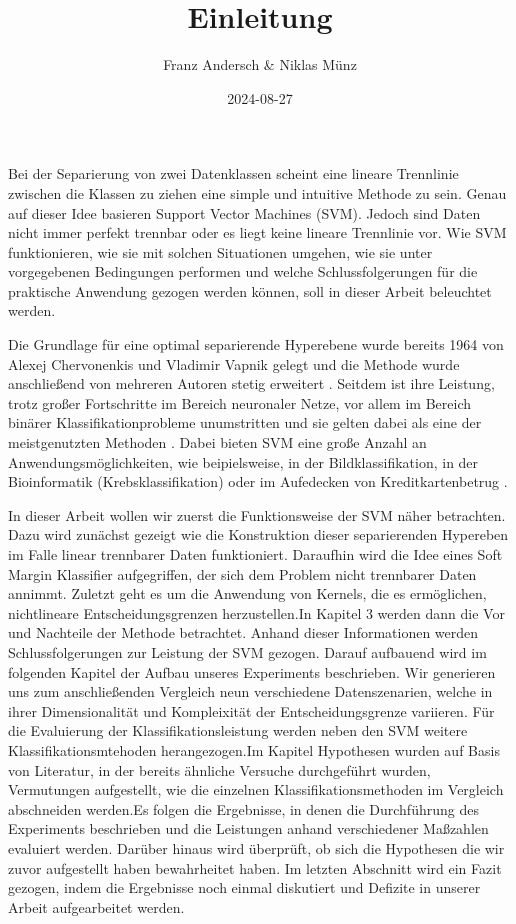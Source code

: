 \documentclass[
]{article}
\title{Einleitung}
\author{Franz Andersch \& Niklas Münz}
\date{2024-08-27}
\renewcommand{\maketitle}{}
\begin{document}
\maketitle

Bei der Separierung von zwei Datenklassen scheint eine lineare
Trennlinie zwischen die Klassen zu ziehen eine simple und intuitive
Methode zu sein. Genau auf dieser Idee basieren Support Vector Machines
(SVM). Jedoch sind Daten nicht immer perfekt trennbar oder es liegt
keine lineare Trennlinie vor. Wie SVM funktionieren, wie sie mit solchen
Situationen umgehen, wie sie unter vorgegebenen Bedingungen performen
und welche Schlussfolgerungen für die praktische Anwendung gezogen
werden können, soll in dieser Arbeit beleuchtet werden.

Die Grundlage für eine optimal separierende Hyperebene wurde bereits
1964 von Alexej Chervonenkis und Vladimir Vapnik gelegt und die Methode
wurde anschließend von mehreren Autoren stetig erweitert
\parencite{vapnikEstimationDependencesBased2006}. Seitdem ist ihre
Leistung, trotz großer Fortschritte im Bereich neuronaler Netze, vor
allem im Bereich binärer Klassifikationprobleme unumstritten und sie
gelten dabei als eine der meistgenutzten Methoden
\parencite{soofiClassificationTechniquesMachine2017}. Dabei bieten SVM
eine große Anzahl an Anwendungsmöglichkeiten, wie beipielsweise, in der
Bildklassifikation, in der Bioinformatik (Krebsklassifikation) oder im
Aufedecken von Kreditkartenbetrug
\parencite{cervantesComprehensiveSurveySupport2020}.

In dieser Arbeit wollen wir zuerst die Funktionsweise der SVM näher
betrachten. Dazu wird zunächst gezeigt wie die Konstruktion dieser
separierenden Hypereben im Falle linear trennbarer Daten funktioniert.
Daraufhin wird die Idee eines Soft Margin Klassifier aufgegriffen, der
sich dem Problem nicht trennbarer Daten annimmt. Zuletzt geht es um die
Anwendung von Kernels, die es ermöglichen, nichtlineare
Entscheidungsgrenzen herzustellen.\newline In Kapitel 3 werden dann die
Vor und Nachteile der Methode betrachtet. Anhand dieser Informationen
werden Schlussfolgerungen zur Leistung der SVM gezogen. Darauf aufbauend
wird im folgenden Kapitel der Aufbau unseres Experiments beschrieben.
Wir generieren uns zum anschließenden Vergleich neun verschiedene
Datenszenarien, welche in ihrer Dimensionalität und Kompleixität der
Entscheidungsgrenze variieren. Für die Evaluierung der
Klassifikationsleistung werden neben den SVM weitere
Klassifikationsmtehoden herangezogen.\newline Im Kapitel Hypothesen
wurden auf Basis von Literatur, in der bereits ähnliche Versuche
durchgeführt wurden, Vermutungen aufgestellt, wie die einzelnen
Klassifikationsmethoden im Vergleich abschneiden werden.\newline Es
folgen die Ergebnisse, in denen die Durchführung des Experiments
beschrieben und die Leistungen anhand verschiedener Maßzahlen evaluiert
werden. Darüber hinaus wird überprüft, ob sich die Hypothesen die wir
zuvor aufgestellt haben bewahrheitet haben. Im letzten Abschnitt wird
ein Fazit gezogen, indem die Ergebnisse noch einmal diskutiert und
Defizite in unserer Arbeit aufgearbeitet werden.

\printbibliography
\end{document}
